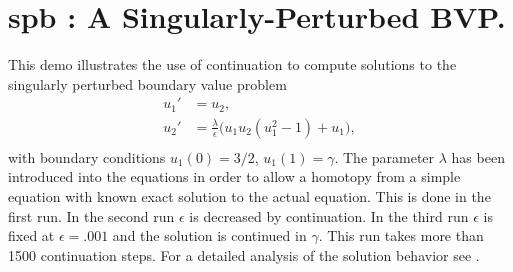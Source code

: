 \documentclass[12pt]{report}
\def\eps{\epsilon}
\begin{document}
\section{ spb : A Singularly-Perturbed BVP.} \label{sec:Demos_spb}
This demo illustrates the use of continuation to compute 
solutions to the singularly perturbed boundary value problem
\begin{equation} \begin{array}{cl}
  u_1 ' &= u_2  ,  \\
  u_2 ' &= \frac{\lambda }{ \eps} \bigl(
  u_1 u_2 (u_1^2 - 1) + u_1
  \bigr)  , \\ \end{array} \end{equation}
with boundary conditions $u_1(0)=3/2$,  $u_1(1)=\gamma.$
The parameter $\lambda$ has been introduced into the equations in order
to allow a homotopy from a simple equation with known exact solution
to the actual equation. This is done in the first run.
In the second run $\eps$ is decreased by continuation.
In the third run $\eps$ is fixed at $\eps=.001$ and the solution is continued 
in $\gamma$.
This run takes more than 1500 continuation steps.
For a detailed analysis of the solution behavior see 
 \citeyear{JL:82}.
\end{document}
